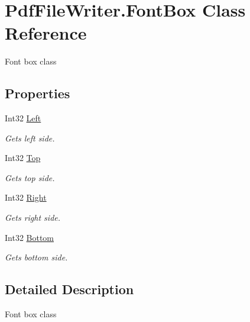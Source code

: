 \hypertarget{class_pdf_file_writer_1_1_font_box}{}\section{Pdf\+File\+Writer.\+Font\+Box Class Reference}
\label{class_pdf_file_writer_1_1_font_box}


Font box class  


\subsection*{Properties}
\begin{DoxyCompactItemize}
\item 
Int32 \hyperlink{class_pdf_file_writer_1_1_font_box_a0b0c7cd75afb3f3cedb4298ca8717320}{Left}
\begin{DoxyCompactList}\small\item\em Gets left side. \end{DoxyCompactList}\item 
Int32 \hyperlink{class_pdf_file_writer_1_1_font_box_a466058d51f79d470562e244eb005384c}{Top}
\begin{DoxyCompactList}\small\item\em Gets top side. \end{DoxyCompactList}\item 
Int32 \hyperlink{class_pdf_file_writer_1_1_font_box_a900427254bf3e38bb6f11262c5059cc6}{Right}
\begin{DoxyCompactList}\small\item\em Gets right side. \end{DoxyCompactList}\item 
Int32 \hyperlink{class_pdf_file_writer_1_1_font_box_af1a7f9cc610e28907494004b9170af56}{Bottom}
\begin{DoxyCompactList}\small\item\em Gets bottom side. \end{DoxyCompactList}\end{DoxyCompactItemize}


\subsection{Detailed Description}
Font box class 

